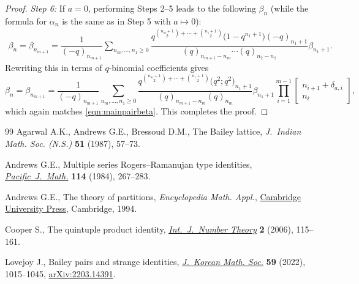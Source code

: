 \documentclass[11pt]{article}
\numberwithin{equation}{section}
\numberwithin{equation}{section}
\begin{document}
\begin{proof}
	{\it Step 6\emph{:}}
	If $a=0$, performing Steps 2--5 leads to the following $\beta_n$ (while the formula for $\alpha_n$ is the same as in Step 5 with $a\mapsto 0$):
	\begin{align*}
		\beta_n=\beta_{n_{m+1}}=
		\dfrac{1}{(-q)_{n_{m+1}}}\sum_{n_m,\dots,n_1\geq 0}
		\dfrac{q^{\binom{n_{m}+1}{2}+\cdots+\binom{n_1+1}{2}}\bigl(1-q^{n_{1}+1}\bigr)(-q)_{n_1+1}}
		{(q)_{n_{m+1}-n_{m}}\cdots (q)_{n_2-n_1}}
		\beta_{n_1+1}.
	\end{align*}
	Rewriting this in terms of $q$-binomial coefficients gives
	\begin{equation*} %
		\beta_n = \beta_{n_{m+1}} = \frac{1}{(-q)_{n_{m+1}}} \sum_{n_m, \dots, n_1 \geq 0} \frac{q^{\binom{n_m+1}{2} + \cdots + \binom{n_1+1}{2}}\bigl(q^2;q^2\bigr)_{n_1+1}}{(q)_{n_{m+1}-n_m} (q)_{n_m}} \beta_{n_1+1} \prod_{i=1}^{m-1} \begin{bmatrix} n_{i+1} + \delta_{a,i} \\ n_i \end{bmatrix},
	\end{equation*}
	which again matches \eqref{eqn:mainpairbeta}. This completes the proof.
\end{proof}
\begin{thebibliography}{99}
Agarwal A.K., Andrews G.E., Bressoud D.M., The {B}ailey lattice,
 \textit{J.~Indian Math. Soc. (N.S.)} \textbf{51} (1987), 57--73.

Andrews G.E., Multiple series {R}ogers--{R}amanujan type identities,
 \href{https://doi.org/10.2140/pjm.1984.114.267}{\textit{Pacific~J.~Math.}} \textbf{114} (1984), 267--283.

Andrews G.E., The theory of partitions, \textit{Encyclopedia Math. Appl.}, \href{https://doi.org/10.1017/CBO9780511608650}{Cambridge
 University Press}, Cambridge, 1994.

Cooper S., The quintuple product identity, \href{https://doi.org/10.1142/S1793042106000401}{\textit{Int.~J.~Number Theory}}
 \textbf{2} (2006), 115--161.

Lovejoy J., Bailey pairs and strange identities, \href{https://doi.org/10.4134/JKMS.j220167}{\textit{J.~Korean Math. Soc.}}
 \textbf{59} (2022), 1015--1045, \href{https://arxiv.org/abs/2203.14391}{arXiv:2203.14391}.

\end{thebibliography}
\end{document}
